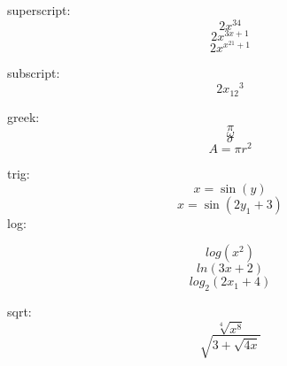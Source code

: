 \documentclass[11pt]{article}
\begin{document}
superscript:
$$2x^{34}$$
$$2x^{3x+1}$$
$$2x^{x^{21}+1}$$

subscript:
$$2{x_{12}}^3$$

greek:
$$\pi$$
$$\omega$$
$$\sigma$$
$$A=\pi r^2$$

trig:
$$x=\sin(y)$$
$$x=\sin(2y_1+3)$$
log:

$$log(x^2)$$
$$ln(3x+2)$$
$$log_2(2x_1+4)$$

sqrt:
$$\sqrt[4]{x^8}$$
$$\sqrt{3+\sqrt{4x}}$$
\end{document}
